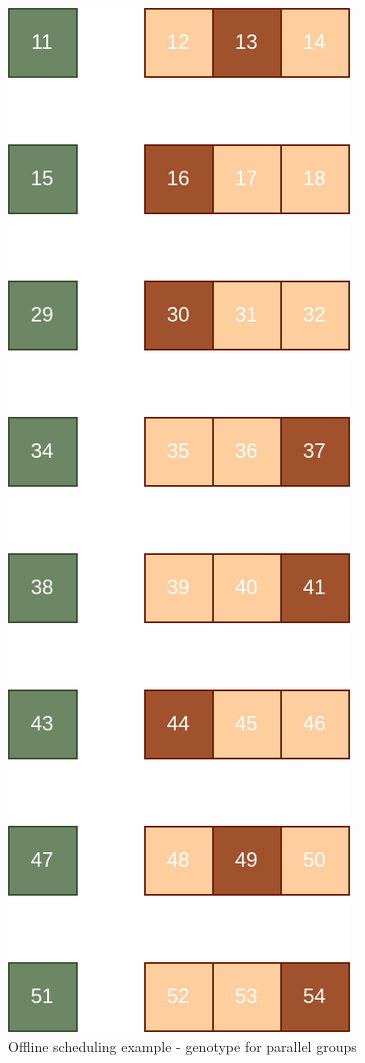 \begin{figure}[!htbp]
	\centering
	\includegraphics[scale=0.3]{../images/offline_scheduling_genotype_parallel.png}
	\caption{Offline scheduling example - genotype for parallel groups}
    \label{fig:offline_scheduling_genotype_parallel}
\end{figure}

